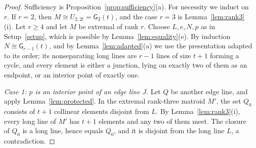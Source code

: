 \documentclass[11pt]{amsart}
\theoremstyle{definition}
\theoremstyle{remark}
\numberwithin{equation}{section}
\newcommand{\GW}{\mathsf{G}}
\begin{document}
\begin{proof}
Sufficiency is Proposition~\ref{prop:sufficiency}(a). For necessity we induct on $r$. If $r=2$, then $M\cong U_{2,2t}=\GW_2(t)$, and the case $r=3$ is Lemma~\ref{lem:rank3}(i). Let $r\ge4$ and let $M$ be extremal of rank $r$. Choose $L,e,N,p$ as in Setup~\ref{setup}, which is possible by Lemma~\ref{lem:equality}(e). By induction $N\cong\GW_{r-1}(t)$, and by Lemma~\ref{lem:adapted}(a) we use the presentation adapted to its order; its nonseparating long lines are $r-1$ lines of size $t+1$ forming a cycle, and every element is either a junction, lying on exactly two of them as an endpoint, or an interior point of exactly one.

\emph{Case 1: $p$ is an interior point of an edge line $J$.} Let $Q$ be another edge line, and apply Lemma~\ref{lem:protected}. In the extremal rank-three matroid $M'$, the set $Q_0$ consists of $t+1$ collinear elements disjoint from $L$. By Lemma~\ref{lem:rank3}(i), every long line of $M'$ has $t+1$ elements and any two of them meet. The closure of $Q_0$ is a long line, hence equals $Q_0$, and it is disjoint from the long line $L$, a contradiction.


\end{proof}
\end{document}
